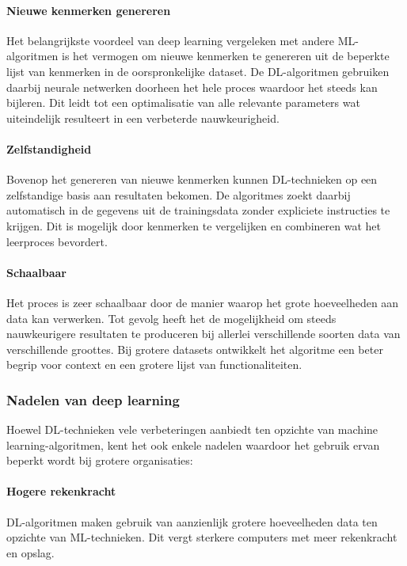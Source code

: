 \paragraph{Nieuwe kenmerken genereren}
Het belangrijkste voordeel van deep learning vergeleken met andere ML-algoritmen is het vermogen om nieuwe kenmerken te genereren uit de beperkte lijst van kenmerken in de oorspronkelijke dataset.
De DL-algoritmen gebruiken daarbij neurale netwerken doorheen het hele proces waardoor het steeds kan bijleren.
Dit leidt tot een optimalisatie van alle relevante parameters wat uiteindelijk resulteert in een verbeterde nauwkeurigheid.

\paragraph{Zelfstandigheid}
Bovenop het genereren van nieuwe kenmerken kunnen DL-technieken op een zelfstandige basis aan resultaten bekomen.
De algoritmes zoekt daarbij automatisch in de gegevens uit de trainingsdata zonder expliciete instructies te krijgen.
Dit is mogelijk door kenmerken te vergelijken en combineren wat het leerproces bevordert.

\paragraph{Schaalbaar}
Het proces is zeer schaalbaar door de manier waarop het grote hoeveelheden aan data kan verwerken.
Tot gevolg heeft het de mogelijkheid om steeds nauwkeurigere resultaten te produceren bij allerlei verschillende soorten data van verschillende groottes.
Bij grotere datasets ontwikkelt het algoritme een beter begrip voor context en een grotere lijst van functionaliteiten.

\subsubsection{Nadelen van deep learning}
Hoewel DL-technieken vele verbeteringen aanbiedt ten opzichte van machine learning-algoritmen, kent het ook enkele nadelen waardoor het gebruik ervan beperkt wordt bij grotere organisaties:

\paragraph{Hogere rekenkracht}
DL-algoritmen maken gebruik van aanzienlijk grotere hoeveelheden data ten opzichte van ML-technieken.
Dit vergt sterkere computers met meer rekenkracht en opslag.
